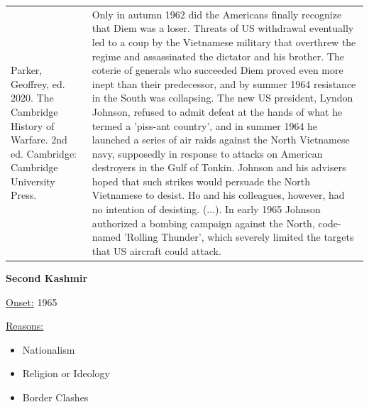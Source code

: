 {\begin{longtable}{p{}p{}}
Parker, Geoffrey, ed. 2020. The Cambridge History of Warfare. 2nd ed. Cambridge: Cambridge University Press. & Only in autumn 1962 did the Americans finally recognize that Diem was a loser. Threats of US withdrawal eventually led to a coup by the Vietnamese military that overthrew the regime and assassinated the dictator and his brother. The coterie of generals who succeeded Diem proved even more inept than their predecessor, and by summer 1964 resistance in the South was collapsing. The new US president, Lyndon Johnson, refused to admit defeat at the hands of what he termed a 'piss-ant country', and in summer 1964 he launched a series of air raids against the North Vietnamese navy, supposedly in response to attacks on American destroyers in the Gulf of Tonkin. Johnson and his advisers hoped that such strikes would persuade the North Vietnamese to desist. Ho and his colleagues, however, had no intention of desisting. (...). In early 1965 Johnson authorized a bombing campaign against the North, code-named 'Rolling Thunder', which severely limited the targets that US aircraft could attack.  
\\
\end{longtable}}
\clearpage
         \textbf{Second Kashmir} 

          \underline{Onset:} 1965         

\underline{Reasons:}
\begin{itemize}
\item Nationalism
\item Religion or Ideology
\item Border Clashes
\end{itemize}

